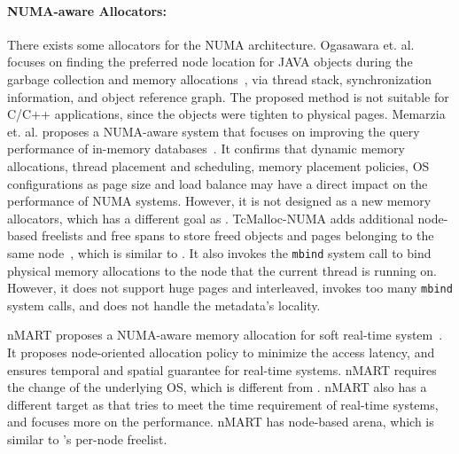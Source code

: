 \paragraph{NUMA-aware Allocators:} There exists some allocators for the NUMA architecture. 
Ogasawara et. al. focuses on finding the preferred node location for JAVA objects during the garbage collection and memory allocations~\cite{Ogasawara:2009:NMM:1640089.1640117}, via thread stack, synchronization information, and object reference graph. The proposed method is not suitable for C/C++ applications, since the objects were tighten to physical pages. 
Memarzia et. al. proposes a NUMA-aware system that  focuses on improving the query performance of in-memory databases~\cite{wagle2015numa}. It confirms that dynamic memory allocations, thread placement and scheduling, memory placement policies, OS configurations as page size and load balance may have a direct impact on the performance of NUMA systems. However, it is not designed as a new memory allocators, which has a different goal as \NM{}. TcMalloc-NUMA adds additional node-based freelists and free spans to store freed objects and pages belonging to the same node~\cite{tcmallocnew}, which is similar to \NM{}. It also invokes the \texttt{mbind} system call to bind physical memory allocations to the node that the current thread is running on. However, it does not support huge pages and interleaved, invokes too many \texttt{mbind} system calls, and does not handle the metadata's locality. 

nMART proposes a NUMA-aware memory allocation for soft real-time system~\cite{kim2013node}. It proposes node-oriented allocation policy to minimize the access latency, and ensures temporal and spatial guarantee for real-time systems. nMART requires the change of the underlying OS, which is different from \NM{}. nMART also has a different target as \NM{} that tries to meet the time requirement of real-time systems, and \NM{} focuses more on the performance. nMART has node-based arena, which is similar to \NM{}'s per-node freelist. 

 





